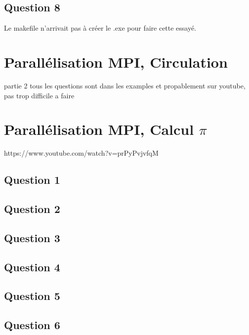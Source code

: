 \documentclass{article}
\begin{document}
\newpage\subsection*{Question 8}
\begin{resolution}
    Le makefile n'arrivait pas à créer le .exe pour faire cette essayé.
\end{resolution}


\section{Parallélisation MPI, Circulation}

partie 2
tous les questions sont dans les examples et propablement sur youtube, pas trop difficile a faire
\begin{scriptsize}
    \mycode
\end{scriptsize}



\section{Parallélisation MPI, Calcul $\pi$}
https://www.youtube.com/watch?v=prPyPvjvfqM
\newpage\subsection*{Question 1}

\newpage\subsection*{Question 2}

\newpage\subsection*{Question 3}

\newpage\subsection*{Question 4}

\newpage\subsection*{Question 5}

\newpage\subsection*{Question 6}
\end{document}
